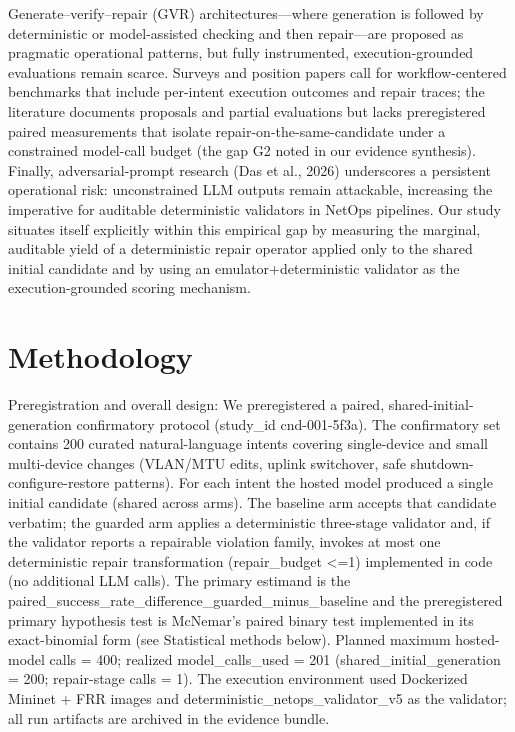 \documentclass[conference]{IEEEtran}
\begin{document}
Generate--verify--repair (GVR) architectures---where generation is followed by deterministic or model-assisted checking and then repair---are proposed as pragmatic operational patterns, but fully instrumented, execution-grounded evaluations remain scarce. Surveys and position papers call for workflow-centered benchmarks that include per-intent execution outcomes and repair traces; the literature documents proposals and partial evaluations but lacks preregistered paired measurements that isolate repair-on-the-same-candidate under a constrained model-call budget (the gap G2 noted in our evidence synthesis). Finally, adversarial-prompt research (Das et al., 2026) underscores a persistent operational risk: unconstrained LLM outputs remain attackable, increasing the imperative for auditable deterministic validators in NetOps pipelines. Our study situates itself explicitly within this empirical gap by measuring the marginal, auditable yield of a deterministic repair operator applied only to the shared initial candidate and by using an emulator+deterministic validator as the execution-grounded scoring mechanism.

\section{Methodology}
Preregistration and overall design: We preregistered a paired, shared-initial-generation confirmatory protocol (study\_id cnd-001-5f3a). The confirmatory set contains 200 curated natural-language intents covering single-device and small multi-device changes (VLAN/MTU edits, uplink switchover, safe shutdown-configure-restore patterns). For each intent the hosted model produced a single initial candidate (shared across arms). The baseline arm accepts that candidate verbatim; the guarded arm applies a deterministic three-stage validator and, if the validator reports a repairable violation family, invokes at most one deterministic repair transformation (repair\_budget <=1) implemented in code (no additional LLM calls). The primary estimand is the paired\_success\_rate\_difference\_guarded\_minus\_baseline and the preregistered primary hypothesis test is McNemar's paired binary test implemented in its exact-binomial form (see Statistical methods below). Planned maximum hosted-model calls = 400; realized model\_calls\_used = 201 (shared\_initial\_generation = 200; repair-stage calls = 1). The execution environment used Dockerized Mininet + FRR images and deterministic\_netops\_validator\_v5 as the validator; all run artifacts are archived in the evidence bundle.
\end{document}
